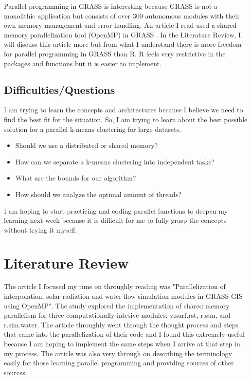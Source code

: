 \documentclass[a4paper,10pt]{article}
\begin{document}
Parallel programming in GRASS is interesting because GRASS is not a monolithic application but consists of over 300 
autonomous modules with their own memory management and error handling. An article I read used a shared memory 
parallelization tool (OpenMP) in GRASS \cite{hofierka2017parallel}. In the Literature Review, I will discuss this article 
more but from what I understand there is more freedom for parallel programming in GRASS than R. R feels very restrictive 
in the packages and functions but it is easier to implement.  

\subsection{Difficulties/Questions}
I am trying to learn the concepts and architectures because I believe we need to find the best fit for the situation. 
So, I am trying to learn about the best possible solution for a parallel k-means clustering for large datasets.
\begin{itemize}
    \item Should we use a distributed or shared memory?
    \item How can we separate a k-means clustering into independent tasks?
    \item What are the bounds for our algorithm?
    \item How should we analyze the optimal amount of threads?
\end{itemize}
I am hoping to start practicing and coding parallel functions to deepen my learning next week because it is difficult for
me to fully grasp the concepts without trying it myself.

\section{Literature Review}

The article I focused my time on throughly reading was "Parallelization of interpolation, solar radiation and water 
flow simulation modules in GRASS GIS using OpenMP". The study explored the implementation of shared memory parallelism
for three computationally intesive modules: v.surf.rst, r.sun, and r.sim.water. The article throughly went through the
thought process and steps that came into the parallelization of their code and I found this extremely useful because I
am hoping to implement the same steps when I arrive at that step in my process. The article was also very through on 
describing the terminology easily for those learning parallel programming and providing sources of other sources. \cite{hofierka2017parallel}
\end{document}
